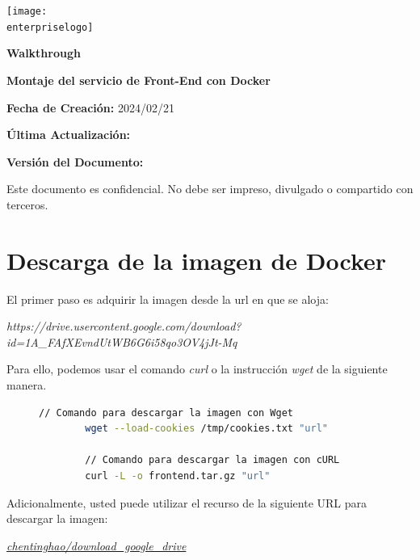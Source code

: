 \documentclass[11pt,a4paper]{article}
\newcommand{\enterpriselogo}{images/colnex.png}
\begin{document}
\begin{titlepage}
    \centering
    \texttt{[image: \\enterpriselogo]}
    \par
    \vfill
    {\LARGE\bfseries Walkthrough}
    \par\vspace{0.5cm}
    {\Large\bfseries Montaje del servicio de Front-End con Docker}
    \vfill
    \begin{flushright}
        {\large {\bfseries Fecha de Creación:} 2024/02/21}\par\vspace{0.2cm}
        {\large {\bfseries Última Actualización:} \gitdate{}}\par\vspace{0.3cm}
        {\large {\bfseries Versión del Documento:} \gitversion{}}
    \end{flushright}
  \vfill
  Este documento es confidencial.
  No debe ser impreso, divulgado o compartido con terceros.
\end{titlepage}

\tableofcontents
\newpage
{}

\section{Descarga de la imagen de Docker}
El primer paso es adquirir la imagen desde la url en que se aloja:\par
\textit{https://drive.usercontent.google.com/download?id=1A\_FAfXEvndUtWB6G6i58qo3OV4jJt-Mq}\par
Para ello, podemos usar el comando \textit{curl} o la instrucción \textit{wget}
de la siguiente manera.

\begin{figure}[h]
    \begin{lstlisting}[language=Bash]
        // Comando para descargar la imagen con Wget
        wget --load-cookies /tmp/cookies.txt "url"

        // Comando para descargar la imagen con cURL
        curl -L -o frontend.tar.gz "url"
    \end{lstlisting}
\end{figure}

Adicionalmente, usted puede utilizar el recurso de la siguiente URL para descargar la imagen:\par
\centerline{\textit{\href{https://github.com/chentinghao/download_google_drive}{chentinghao/download\_google\_drive}}}
\end{document}
